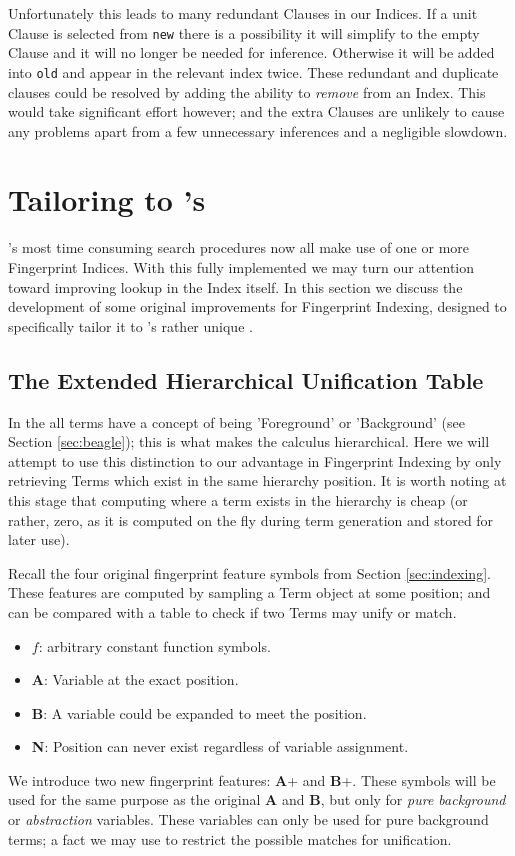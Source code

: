 Unfortunately this leads to many redundant Clauses in our Indices. If a unit Clause
is selected from \verb!new! there is a possibility it will simplify to the empty
Clause and it will no longer be needed for inference. Otherwise it will be added
into \verb!old! and appear in the relevant index twice. These redundant and 
duplicate clauses could be resolved by adding the ability to \emph{remove} from
an Index. This would take significant effort however; and the extra Clauses are
unlikely to cause any problems apart from a few unnecessary inferences and a negligible slowdown. 

\section{Tailoring to \Beagle's \HSWAC}
\label{sec:tailored}

\Beagle's most time consuming search procedures now all make use of one or more
Fingerprint Indices. With this fully implemented we may turn our attention
toward improving lookup in the Index itself.
In this section we discuss the development of some original improvements for Fingerprint Indexing,
designed to specifically tailor it to \beagle's
rather unique \HSWAC.

\subsection{The Extended Hierarchical Unification Table}

In the {\HSWAC} all terms have 
a concept of being 'Foreground' or 'Background' (see Section \ref{sec:beagle});
this is what makes the calculus hierarchical. 
Here we will attempt to use this distinction to our advantage in Fingerprint Indexing
by only retrieving Terms which exist in the same hierarchy position. It is
worth noting at this stage that computing where a term exists in the hierarchy is cheap (or rather,
zero, as it is computed on the fly during term generation and stored for later use).

Recall the four original fingerprint feature symbols from Section \ref{sec:indexing}.
These features are computed by sampling a Term object at some position; and can be compared
with a table to check if two Terms may unify or match.
\begin{itemize}
\item $f$: arbitrary constant function symbols.
\item \textbf{A}: Variable at the exact position.
\item \textbf{B}: A variable could be expanded to meet the position.
\item \textbf{N}: Position can never exist regardless of variable assignment.
\end{itemize}
We introduce two new fingerprint features: \textbf{A}+ and \textbf{B}+.
These symbols will be used for the same purpose as the original \textbf{A} and \textbf{B}, but
only for \emph{pure background} or \emph{abstraction} variables. These variables
can only be used for pure background terms; a fact we may use to restrict the possible
matches for unification.

